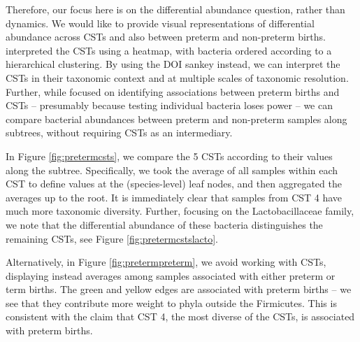 \documentclass[12pt]{article}
\begin{document}
Therefore, our focus here is on the differential abundance question,
rather than dynamics. We would like to provide visual representations of
differential abundance across CSTs and also between preterm and non-preterm
births. \citet{digiulio2015temporal} interpreted the CSTs using a heatmap, with
bacteria ordered according to a hierarchical clustering. By using the DOI sankey
instead, we can interpret the CSTs in their taxonomic context and at multiple
scales of taxonomic resolution. Further, while
\citet{digiulio2015temporal} focused on identifying associations between
preterm births and CSTs -- presumably because testing individual bacteria loses
power -- we can compare bacterial abundances between preterm and non-preterm
samples along subtrees, without requiring CSTs as an intermediary.

In Figure \ref{fig:pretermcsts}, we compare the 5 CSTs according to
their values along the subtree. Specifically, we took the average of all
samples within each CST to define values at the (species-level) leaf
nodes, and then aggregated the averages up to the root. It is
immediately clear that samples from CST 4 have much more taxonomic
diversity. Further, focusing on the Lactobacillaceae family, we note
that the differential abundance of these bacteria distinguishes the
remaining CSTs, see Figure \ref{fig:pretermcstslacto}.

Alternatively, in Figure \ref{fig:pretermpreterm}, we avoid working with CSTs,
displaying instead averages among samples associated with either preterm or term
births. The green and yellow edges are associated with preterm births -- we see
that they contribute more weight to phyla outside the Firmicutes. This is
consistent with the claim that CST 4, the most diverse of the CSTs, is
associated with preterm births.
\end{document}
